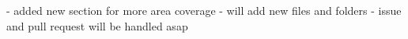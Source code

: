 - added new section for more area coverage
- will add new files and folders
- issue and pull request will be handled asap
